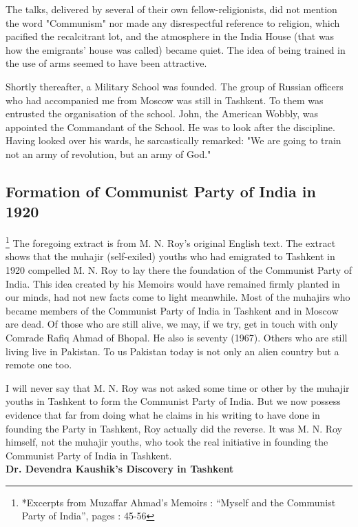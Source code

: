 The talks, delivered by several of their own fellow-religionists, did not mention the word "Communism" nor made any disrespectful reference to religion, which pacified the recalcitrant lot, and the atmosphere in the India House (that was how the emigrants' house was called) became quiet. The idea of being trained in the use of arms seemed to have been attractive. 

Shortly thereafter, a Military School was founded. The group of Russian officers who had accompanied me from Moscow was still in Tashkent. To them was entrusted the organisation of the school. John, the American Wobbly, was appointed the Commandant of the School. He was to look after 
the discipline. Having looked over his wards, he sarcastically remarked: "We are going to train not an army of revolution, but an army of God." 

\subsection{Formation of Communist Party of India in 1920}
\footnote{*Excerpts from Muzaffar Ahmad's Memoirs : “Myself and the Communist Party of India”, pages : 45-56}
The foregoing extract is from M. N. Roy’s original English text. The extract shows that the muhajir (self-exiled) youths who had emigrated to Tashkent in 1920 compelled M. N. Roy to lay there the foundation of the Communist Party of India. This idea created by his Memoirs would have remained firmly planted in our minds, had not new facts come to light meanwhile. Most of the muhajirs who became members of the Communist Party of India in Tashkent and in Moscow are dead. Of those who are still alive, we may, if we try, get in touch with only Comrade Rafiq Ahmad of Bhopal. He also is seventy (1967). Others who are still living live in Pakistan. To us Pakistan today is not only an alien country but a remote one too.

I will never say that M. N. Roy was not asked some time or other by the muhajir youths in Tashkent to form the Communist Party of India. But we now possess evidence that far from doing what he claims in his writing to have done in founding the Party in Tashkent, Roy actually did the 
reverse. It was M. N. Roy himself, not the muhajir youths, who took the real initiative in founding the Communist Party of India in Tashkent. \\

\textbf{Dr. Devendra Kaushik’s Discovery in Tashkent}\\

